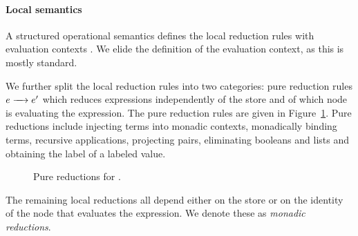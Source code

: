 \paragraph{Local semantics}
A structured operational semantics defines the local reduction rules with evaluation contexts \cite{Felleisen:1988:TPF:73560.73576}. We elide the definition of the evaluation context, as this is mostly standard.

We further split the local reduction rules into two categories: pure reduction rules $\steppure{\expr}{\expr'}$ which reduces expressions independently of the store and of which node is evaluating the expression. The pure reduction rules are given in Figure~\ref{fig:pure-reductions}. Pure reductions include injecting terms into monadic contexts, monadically binding terms, recursive applications, projecting pairs, eliminating booleans and lists and obtaining the label of a labeled value.

\begin{figure}
    \centering
    \caption{Pure reductions for \lang.}
    \label{fig:pure-reductions}
\end{figure}

The remaining local reductions all depend either on the store or on the identity of the node that evaluates the expression. We denote these as \emph{monadic reductions}.

